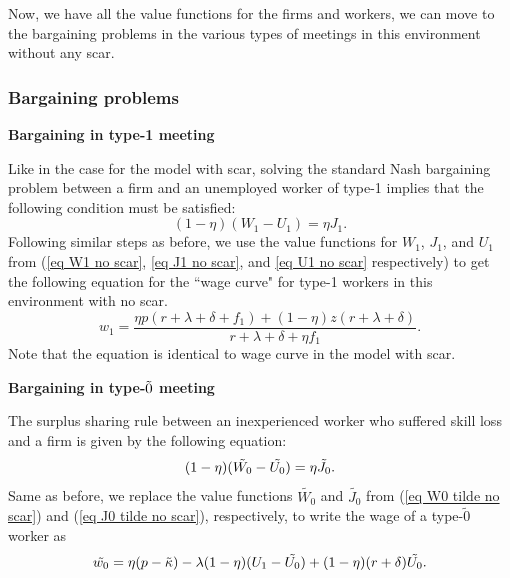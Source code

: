 \documentclass[12pt]{article} %
\theoremstyle{definition}
\begin{document}
Now, we have all the value functions for the firms and workers, we can move to the bargaining problems in the various types of meetings in this environment without any scar. 

\subsubsection{Bargaining problems}\label{section bargaining no scar} 
\textbf{Bargaining in type-1 meeting}

\medskip 

\noindent Like in the case for the model with scar, solving the standard Nash bargaining problem between a firm and an unemployed worker of type-1 implies that the following condition must be satisfied:
\begin{equation}
(1-\eta)(W_1-U_1) = \eta J_1. \label{eq bargain 1 no scar}
\end{equation}
Following similar steps as before, we use the value functions for $W_1$, $J_1$, and $U_1$ from (\ref{eq W1 no scar}, \ref{eq J1 no scar}, and \ref{eq U1 no scar} respectively) to get the following equation for the ``wage curve" for type-1 workers in this environment with no scar. 
\begin{equation}
 w_1 = \frac{\eta p (r+\lambda+\delta+f_1)+(1-\eta)z(r+\lambda+\delta)}{r+\lambda+\delta + \eta f_1}. \label{eq WC1 no scar}
\end{equation} Note that the equation is identical to wage curve in the model with scar. 

\bigskip 

\noindent \textbf{Bargaining in type-$\Tilde{0}$ meeting}

\medskip 

\noindent The surplus sharing rule between an inexperienced worker who suffered skill loss and a firm is given by the following equation:
\begin{equation}
       (1-\eta)(\Tilde{W_0}-\Tilde{U_0}) = \eta \Tilde{J_0}.  \label{eq bargain 0 tilde no scar}
\end{equation}Same as before, we replace the value functions $\tilde{W_0}$ and $\tilde{J_0}$ from (\ref{eq W0 tilde no scar}) and (\ref{eq J0 tilde no scar}), respectively, to write the wage of a type-$\tilde{0}$ worker as
\begin{equation}
   \Tilde{w_0} = \eta (p-\Tilde{\kappa})  - \lambda (1-\eta)(U_1 - \Tilde{U_0}) + (1-\eta)(r+\delta) \Tilde{U_0} . \label{eq w0 tilde first step no scar}
    \end{equation}
    
\end{document}
